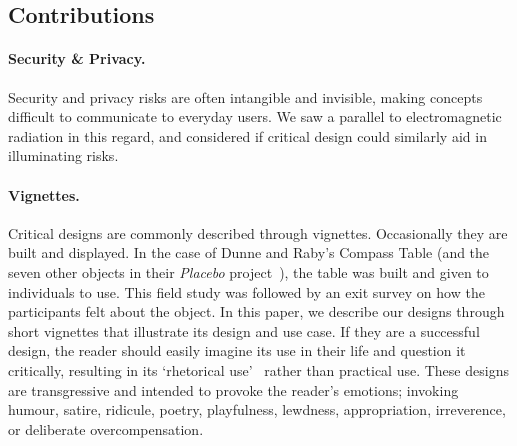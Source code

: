 %
%

\subsection{Contributions}

\paragraph{Security \& Privacy.} Security and privacy risks are often intangible and invisible, making concepts difficult to communicate to everyday users. We saw a parallel to electromagnetic radiation in this regard, and considered if critical design could similarly aid in illuminating risks. 

\paragraph{Vignettes.} Critical designs are commonly described through vignettes. Occasionally they are built and displayed. In the case of Dunne and Raby's Compass Table (and the seven other objects in their \textit{Placebo} project~\cite{DuRa01}), the table was built and given to individuals to use. This field study was followed by an exit survey on how the participants felt about the object. In this paper, we describe our designs through short vignettes that illustrate its design and use case. If they are a successful design, the reader should easily imagine its use in their life and question it critically, resulting in its `rhetorical use'~\cite{Mal17} rather than practical use. These designs are transgressive and intended to provoke the reader's emotions; invoking humour, satire, ridicule, poetry, playfulness, lewdness, appropriation, irreverence, or deliberate overcompensation.

